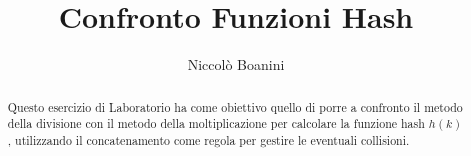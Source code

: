 \documentclass[a4paper,11pt]{article}
\title{Confronto Funzioni Hash}
\author{Niccolò Boanini}
\date{}
\begin{document}
\maketitle
\tableofcontents

\begin{abstract}
Questo esercizio di Laboratorio ha come obiettivo quello di porre a confronto il metodo della divisione con il metodo della moltiplicazione per calcolare la funzione hash $h(k)$, utilizzando il concatenamento come regola per gestire le eventuali collisioni.
\end{abstract}







\end{document}
